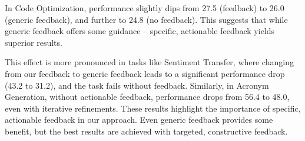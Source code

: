 In Code Optimization, performance slightly dips from 27.5 (\ours feedback) to 26.0 (generic feedback), and further to 24.8 (no feedback). This suggests that while generic feedback offers some guidance -- specific, actionable feedback yields superior results. 




This effect is more pronounced in tasks like Sentiment Transfer, where changing from our feedback to generic feedback leads to a significant performance drop (43.2 to 31.2), and the task fails without feedback. Similarly, in Acronym Generation, without actionable feedback, performance drops from 56.4 to 48.0, even with iterative refinements. These results highlight the importance of specific, actionable feedback in our approach. Even generic feedback provides some benefit, but the best results are achieved with targeted, constructive feedback. %

